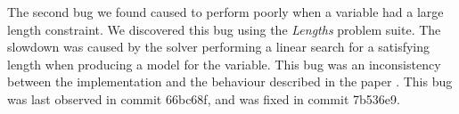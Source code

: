         The second bug we found caused \us{} to perform poorly when a variable had a large length constraint. We discovered this bug using the \textit{Lengths} problem suite. The slowdown was caused by the solver performing a linear search for a satisfying length when producing a model for the variable. This bug was an inconsistency between the implementation and the behaviour described in the \us{} paper \cite{z3str3}. This bug was last observed in commit 66bc68f, and was fixed in commit 7b536e9.


